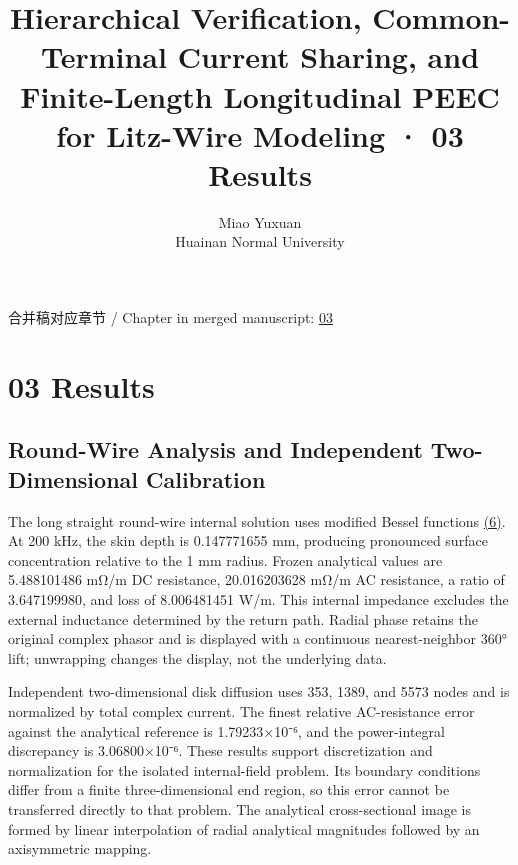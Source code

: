 \documentclass[11pt]{article}
\begin{document}
\title{Hierarchical Verification, Common-Terminal Current Sharing, and Finite-Length Longitudinal PEEC for Litz-Wire Modeling · 03 Results}
\author{Miao Yuxuan\\Huainan Normal University}
\date{}
\maketitle
\noindent 合并稿对应章节 / Chapter in merged manuscript: \href{paper_en_single.pdf#chapter-03}{03}\par
\FloatBarrier
\section*{03 Results}
\hypertarget{chapter-03}{}
\subsection*{Round-Wire Analysis and Independent Two-Dimensional Calibration}
\hypertarget{03.analytic.heading}{}
The long straight round-wire internal solution uses modified Bessel functions \href{paper_en_single.pdf#E03}{(6)}. At 200 kHz, the skin depth is 0.147771655 mm, producing pronounced surface concentration relative to the 1 mm radius. Frozen analytical values are 5.488101486 mΩ/m DC resistance, 20.016203628 mΩ/m AC resistance, a ratio of 3.647199980, and loss of 8.006481451 W/m. This internal impedance excludes the external inductance determined by the return path. Radial phase retains the original complex phasor and is displayed with a continuous nearest-neighbor 360° lift; unwrapping changes the display, not the underlying data.


Independent two-dimensional disk diffusion uses 353, 1389, and 5573 nodes and is normalized by total complex current. The finest relative AC-resistance error against the analytical reference is 1.79233×10⁻⁶, and the power-integral discrepancy is 3.06800×10⁻⁶. These results support discretization and normalization for the isolated internal-field problem. Its boundary conditions differ from a finite three-dimensional end region, so this error cannot be transferred directly to that problem. The analytical cross-sectional image is formed by linear interpolation of radial analytical magnitudes followed by an axisymmetric mapping.
\end{document}
